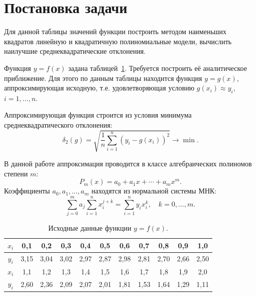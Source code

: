 \section{Постановка задачи}

Для данной таблицы значений функции построить методом наименьших квадратов
линейную и квадратичную полиномиальные модели, вычислить наилучшие
среднеквадратические отклонения.

Функция $y = f(x)$ задана таблицей~\ref{tab:source}. Требуется построить её
аналитическое приближение. Для этого по данным таблицы находится функция
$y = g(x)$, аппроксимирующая исходную, т.е. удовлетворяющая условию
$g(x_i) \approx y_i$, $i = 1, \ldots, n$.

Аппроксимирующая функция строится из условия минимума среднеквадратического
отклонения:
\[
\delta_2(g) = \sqrt{\frac{1}{n}\sum_{i=1}^{n}(y_i - g(x_i))^2} \to \min.
\]

В данной работе аппроксимация проводится в классе алгебраических полиномов
степени $m$:
\[
P_m(x) = a_0 + a_1 x + \cdots + a_m x^m.
\]
Коэффициенты $a_0, a_1, \ldots, a_m$ находятся из нормальной системы МНК:
\[
\sum_{j=0}^{m} a_j \sum_{i=1}^{n} x_i^{j+k} = \sum_{i=1}^{n} y_i x_i^k,
\quad k = 0, \ldots, m.
\]

\begin{table}[h!]
\centering
\begin{tabular}{|c|c|c|c|c|c|c|c|c|c|c|}
\hline
$x_i$ & 0,1 & 0,2 & 0,3 & 0,4 & 0,5 & 0,6 & 0,7 & 0,8 & 0,9 & 1,0 \\
\hline
$y_i$ & 3,15 & 3,04 & 3,02 & 2,97 & 2,87 & 2,98 & 2,81 & 2,70 & 2,66 & 2,50 \\
\hline
\hline
$x_i$ & 1,1 & 1,2 & 1,3 & 1,4 & 1,5 & 1,6 & 1,7 & 1,8 & 1,9 & 2,0 \\
\hline
$y_i$ & 2,60 & 2,36 & 2,09 & 2,07 & 2,01 & 1,81 & 1,53 & 1,64 & 1,29 & 1,11 \\
\hline
\end{tabular}
\caption{Исходные данные функции $y = f(x)$.}
\label{tab:source}
\end{table}